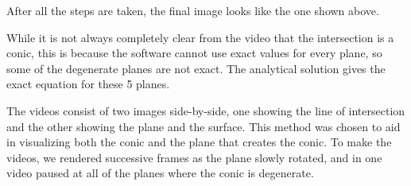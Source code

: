 \documentclass{article}
\begin{document}
	After all the steps are taken, the final image looks like the one shown above.
	
	While it is not always completely clear from the video that the intersection is a conic, this is because the software cannot use exact values for every plane, so some of the degenerate planes are not exact. The analytical solution gives the exact equation for these 5 planes. 
	
	The videos consist of two images side-by-side, one showing the line of intersection and the other showing the plane and the surface. This method was chosen to aid in visualizing both the conic and the plane that creates the conic. To make the videos, we rendered successive frames as the plane slowly rotated, and in one video paused at all of the planes where the conic is degenerate. 
	
\newpage

\nocite{*}


\end{document}
